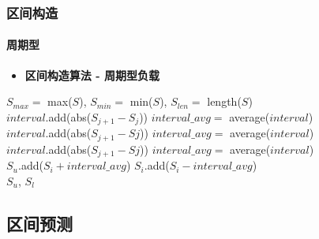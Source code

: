 \begin{frame}[allowframebreaks]
\frametitle{区间构造}
\framesubtitle{周期型}
\begin{itemize}
    \item \textbf{区间构造算法 - 周期型负载}
\end{itemize}
\begin{algorithmic}[1]
    \State $S_{max} =$ max($S$), $S_{min} =$ min($S$), $S_{len} =$ length($S$)
       \\
            \State $interval$.add(abs($S_{j+1}-S_j$))
            \State $interval\_avg =$ average($interval$)
          \EndFor
        \EndIf
        \framebreak \\
            \State $interval$.add(abs($S_{j+1}-S{j}$))
            \State $interval\_avg =$ average($interval$)
          \EndFor
        \EndIf \\
                    \State $interval$.add(abs($S_{j+1}-S{j}$))
                    \State $interval\_avg =$ average($interval$)
                  \EndFor
        \EndIf \\
        \framebreak
        \State $S_u$.add($S_i + interval\_avg$) 
        \State $S_i$.add($S_i - interval\_avg$) 
      \EndFor
    \EndIf \\
    \Return $S_u$, $S_l$
\end{algorithmic}
\end{frame}

\subsection{区间预测}

